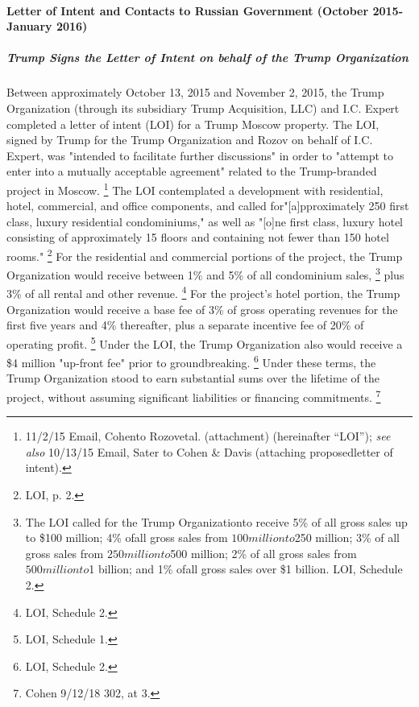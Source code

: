 \paragraph{Letter of Intent and Contacts to Russian Government (October 2015-January 2016)}

\subparagraph{Trump Signs the Letter of Intent on behalf of the Trump Organization}

Between approximately October 13, 2015 and November 2, 2015, the Trump Organization (through its subsidiary Trump Acquisition, LLC) and I.C. Expert completed a letter of intent (LOI) for a Trump Moscow property.
The LOI, signed by Trump for the Trump Organization and Rozov on behalf of I.C. Expert, was "intended to facilitate further discussions" in order to "attempt to enter into a mutually acceptable agreement" related to the Trump-branded project in Moscow.%
\footnote{11/2/15 Email, Cohento Rozovetal. (attachment) (hereinafter “LOI”);
\textit{see also} 10/13/15 Email, Sater to Cohen \& Davis (attaching proposedletter of intent).}
The LOI contemplated a development with residential, hotel, commercial, and office components, and called for"[a]pproximately 250 first class, luxury residential condominiums," as well as "[o]ne first class, luxury hotel consisting of approximately 15 floors and containing not fewer than 150 hotel rooms."%
\footnote{LOI, p. 2.}
For the residential and commercial portions of the project, the Trump Organization would receive between 1\% and 5\% of all condominium sales,%
\footnote{The LOI called for the Trump Organizationto receive 5\% of all gross sales up to \$100 million;
4\% ofall gross sales from $100 million to $250 million;
3\% of all gross sales from $250 million to $500 million;
2\% of all gross sales from $500 million to $1 billion;
and 1\% ofall gross sales over \$1 billion.
LOI, Schedule 2.}
plus 3\% of all rental and other revenue.%
\footnote{LOI, Schedule 2.}
For the project's hotel portion, the Trump Organization would receive a base fee of 3\% of gross operating revenues for the first five years and 4\% thereafter, plus a separate incentive fee of 20\% of operating profit.%
\footnote{LOI, Schedule 1.}
Under the LOI, the Trump Organization also would receive a \$4 million "up-front fee" prior to groundbreaking.%
\footnote{LOI, Schedule 2.}
Under these terms, the Trump Organization stood to earn substantial sums over the lifetime of the project, without assuming significant liabilities or financing commitments.%
\footnote{Cohen 9/12/18 302, at 3.}


